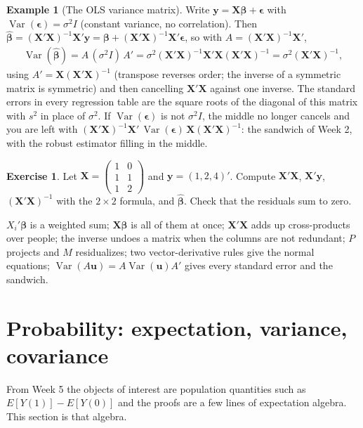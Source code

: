 \documentclass[11pt]{article}
\theoremstyle{definition}
\newtheorem{example}{Example}[section]
\newtheorem{exercise}{Exercise}
\DeclareMathOperator{\Var}{Var}
\newcommand{\E}{E}
\newcommand{\X}{\bm{X}}
\newcommand{\Y}{\bm{y}}
\newcommand{\bbeta}{\bm{\beta}}
\newcommand{\bhat}{\hat{\bm{\beta}}}
\begin{document}
\begin{example}[The OLS variance matrix]
Write $\Y = \X\bbeta + \bm\epsilon$ with $\Var(\bm\epsilon) = \sigma^2 I$
(constant variance, no correlation). Then
$\bhat = (\X'\X)^{-1}\X'\Y = \bbeta + (\X'\X)^{-1}\X'\bm\epsilon$, so with
$A = (\X'\X)^{-1}\X'$,
\begin{align*}
  \Var(\bhat) = A\,(\sigma^2 I)\,A'
  = \sigma^2 (\X'\X)^{-1}\X'\X(\X'\X)^{-1}
  = \sigma^2(\X'\X)^{-1},
\end{align*}
using $A' = \X(\X'\X)^{-1}$ (transpose reverses order; the inverse of a
symmetric matrix is symmetric) and then cancelling $\X'\X$ against one
inverse. The standard errors in every regression table are the square roots
of the diagonal of this matrix with $s^2$ in place of $\sigma^2$. If
$\Var(\bm\epsilon)$ is not $\sigma^2 I$, the middle no longer cancels and
you are left with $(\X'\X)^{-1}\X'\,\Var(\bm\epsilon)\,\X(\X'\X)^{-1}$: the
sandwich of Week 2, with the robust estimator filling in the middle.
\end{example}

\begin{exercise}
Let $\X = \begin{pmatrix} 1 & 0 \\ 1 & 1 \\ 1 & 2 \end{pmatrix}$ and
$\Y = (1, 2, 4)'$. Compute $\X'\X$, $\X'\Y$, $(\X'\X)^{-1}$ with the
$2\times2$ formula, and $\bhat$. Check that the residuals sum to zero.
\end{exercise}

\begin{takeaway}
$X_i'\bbeta$ is a weighted sum; $\X\bbeta$ is all of them at once;
$\X'\X$ adds up cross-products over people; the inverse undoes a matrix
when the columns are not redundant; $P$ projects and $M$ residualizes; two
vector-derivative rules give the normal equations; $\Var(A\bm u) =
A\Var(\bm u)A'$ gives every standard error and the sandwich.
\end{takeaway}

\section{Probability: expectation, variance, covariance}
\label{sec:prob}

From Week 5 the objects of interest are population quantities such as
$\E[Y(1)] - \E[Y(0)]$ and the proofs are a few lines of expectation
algebra. This section is that algebra.
\end{document}
